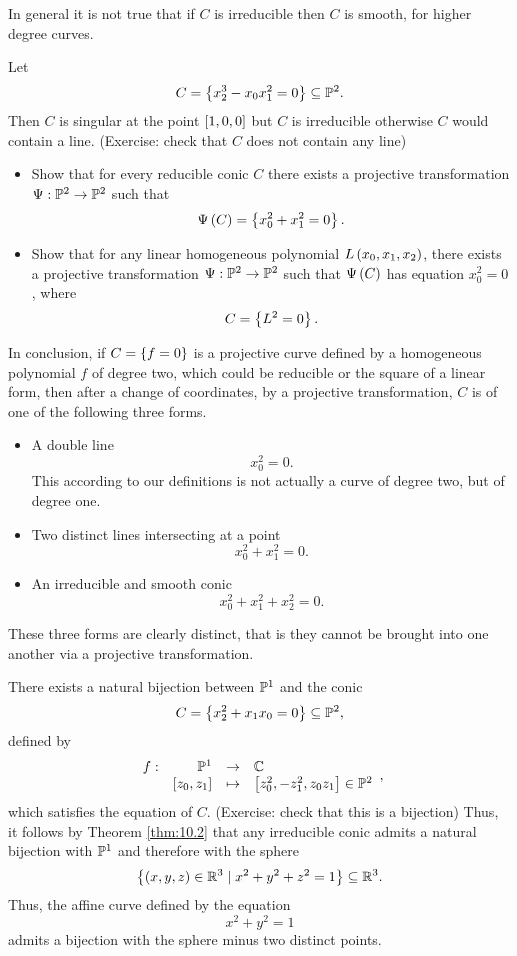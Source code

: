 \begin{remark}
In general it is not true that if $ C $ is irreducible then $ C $ is smooth, for higher degree curves.
\end{remark}

\begin{example}
Let
$$ C = \cb{x_2^3 - x_0x_1^2 = 0} \subseteq \P^2. $$
Then $ C $ is singular at the point $ \sb{1, 0, 0} $ but $ C $ is irreducible otherwise $ C $ would contain a line. (Exercise: check that $ C $ does not contain any line)
\end{example}

\begin{exercise}
\label{ex:30}
\hfill
\begin{itemize}
\item Show that for every reducible conic $ C $ there exists a projective transformation $ \Psi : \P^2 \to \P^2 $ such that
$$ \Psi\rb{C} = \cb{x_0^2 + x_1^2 = 0}. $$
\item Show that for any linear homogeneous polynomial $ L\rb{x_0, x_1, x_2} $, there exists a projective transformation $ \Psi : \P^2 \to \P^2 $ such that $ \Psi\rb{C} $ has equation $ x_0^2 = 0 $, where
$$ C = \cb{L^2 = 0}. $$
\end{itemize}
\end{exercise}

\pagebreak

In conclusion, if $ C = \cb{f = 0} $ is a projective curve defined by a homogeneous polynomial $ f $ of degree two, which could be reducible or the square of a linear form, then after a change of coordinates, by a projective transformation, $ C $ is of one of the following three forms.
\begin{itemize}
\item A double line
$$ x_0^2 = 0. $$
This according to our definitions is not actually a curve of degree two, but of degree one.
\item Two distinct lines intersecting at a point
$$ x_0^2 + x_1^2 = 0. $$
\item An irreducible and smooth conic
$$ x_0^2 + x_1^2 + x_2^2 = 0. $$
\end{itemize}
These three forms are clearly distinct, that is they cannot be brought into one another via a projective transformation.

\begin{remark}
There exists a natural bijection between $ \P^1 $ and the conic
$$ C = \cb{x_2^2 + x_1x_0 = 0} \subseteq \P^2, $$
defined by
$$ \function[f]{\P^1}{\C}{\sb{z_0, z_1}}{\sb{z_0^2, -z_1^2, z_0z_1} \in \P^2}, $$
which satisfies the equation of $ C $. (Exercise: check that this is a bijection) Thus, it follows by Theorem \ref{thm:10.2} that any irreducible conic admits a natural bijection with $ \P^1 $ and therefore with the sphere
$$ \cb{\rb{x, y, z} \in \R^3 \mid x^2 + y^2 + z^2 = 1} \subseteq \R^3. $$
Thus, the affine curve defined by the equation
$$ x^2 + y^2 = 1 $$
admits a bijection with the sphere minus two distinct points.
\end{remark}

